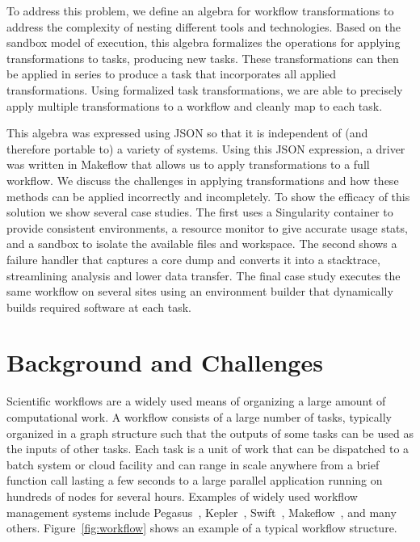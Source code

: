 \documentclass[conference]{IEEEtran}
\begin{document}
To address this problem,
we define an algebra for workflow transformations
to address the complexity of
nesting different tools and technologies.
Based on the sandbox model of execution, 
this algebra formalizes the operations
for applying transformations to tasks, 
producing new tasks.
These transformations can then be applied
in series to produce a task that incorporates
all applied transformations.
Using formalized task transformations,
we are able to precisely apply multiple transformations to a workflow 
and cleanly map to each task.

This algebra was expressed using JSON 
so that it is independent of
(and therefore portable to)
a variety of systems. 
Using this JSON expression, a driver was written
in Makeflow\cite{makeflow-sweet12} that allows us to apply transformations 
to a full workflow.
We discuss the challenges 
in applying transformations and 
how these methods can
be applied incorrectly and incompletely. 
To show the efficacy of this solution
we show several case studies. 
The first uses a Singularity container 
to provide consistent environments, 
a resource monitor to give accurate usage stats, and
a sandbox to isolate the available files and workspace.
The second shows a failure handler that captures a
core dump and converts it into a stacktrace, 
streamlining analysis and lower data transfer.
The final case study executes the same workflow on
several sites using an environment builder 
that dynamically builds required software at each task. 

\section{Background and Challenges}

Scientific workflows are a widely used means of organizing
a large amount of computational work.  A workflow consists
of a large number of tasks, typically organized in a graph structure
such that the outputs of some tasks can be used as the inputs 
of other tasks.  Each task is a unit of work that can be dispatched
to a batch system or cloud facility and can range in scale anywhere
from a brief function call lasting a few seconds to a large parallel
application running on hundreds of nodes for several hours.
Examples of widely used workflow management systems include
Pegasus~\cite{pegasus}, 
Kepler~\cite{doi:10.1002-cpe.94}, 
Swift~\cite{swift}, 
Makeflow~\cite{makeflow-sweet12}, and many others. Figure~\ref{fig:workflow} shows an example of a typical
workflow structure.
\end{document}

